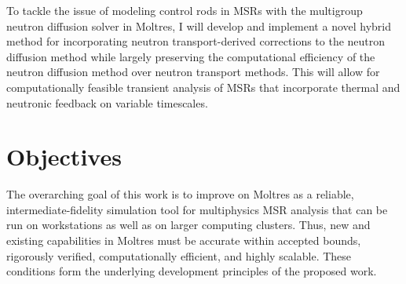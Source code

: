 To tackle the issue of modeling control rods in \glspl{MSR} with the multigroup neutron diffusion
solver in Moltres, I will develop and implement a novel hybrid method for incorporating neutron
transport-derived corrections to the neutron diffusion method while largely preserving the
computational efficiency of the neutron diffusion method over neutron transport methods. This will
allow for computationally feasible transient analysis of \glspl{MSR} that incorporate thermal and
neutronic feedback on variable timescales.

\section{Objectives}

The overarching goal of this work is to improve on Moltres as a reliable, intermediate-fidelity
simulation tool for multiphysics \gls{MSR} analysis that can be run on workstations as well as on
larger computing clusters. Thus, new and existing capabilities in Moltres must
be accurate within accepted bounds, rigorously verified, computationally efficient, and highly
scalable. These conditions form the underlying development principles of the proposed work.

